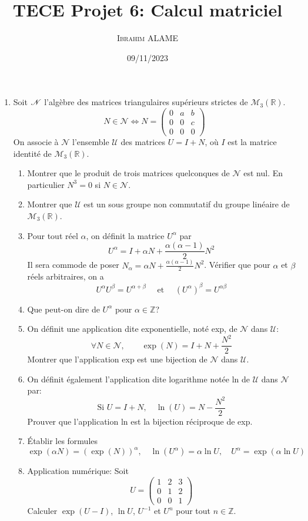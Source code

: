\documentclass{article}[11pt]
\title{TECE Projet 6: Calcul matriciel}
\author{ \textsc{Ibrahim ALAME}}
\date{09/11/2023}
\begin{document}
\maketitle
\begin{enumerate}
\item Soit ${\cal N}$ l'algèbre des matrices triangulaires supérieurs strictes de $\mathcal{M}_3(\mathbb{R})$.
\[N\in \mathcal{N} \Longleftrightarrow N=\left(\begin{array}{ccc} 0&a&b\\ 0&0&c\\0&0&0
\end{array}\right)\]
On associe à $\mathcal{N}$ l'ensemble  $\mathcal{U}$  des matrices $U=I+N$, où $I$ est la matrice identité de $\mathcal{M}_3(\mathbb{R})$.
\begin{enumerate}
\item  Montrer que le produit de trois matrices quelconques de $\mathcal{N}$ est nul. En particulier $N^3=0$ si $N\in\mathcal{N}$.
\item Montrer que $\mathcal{U}$ est un sous groupe non commutatif du groupe linéaire de $\mathcal{M}_3(\mathbb{R})$.
\item Pour tout réel $\alpha$, on définit la matrice $U^\alpha$ par
\[U^\alpha=I+\alpha N+\frac{\alpha(\alpha-1)}{2}N^2\]
Il sera commode de poser $N_\alpha = \alpha N +\frac{\alpha(\alpha-1)}{2}N^2$. Vérifier que pour $\alpha$ et $\beta$ réels arbitraires, on a
\[U^\alpha U^\beta =U^{\alpha+\beta}\quad\mbox{ et }\quad (U^\alpha)^\beta=U^{\alpha\beta}\]
\item Que peut-on dire de $U^\alpha$ pour $\alpha\in\mathbb{Z}$?
\item On définit une application dite exponentielle, noté exp, de $\mathcal{N}$ dans $\mathcal{U}$:
\[\forall N\in\mathcal{N},\qquad \exp(N)=I+N+\frac{N^2}{2}\]
Montrer que l'application exp est une bijection de $\mathcal{N}$ dans $\mathcal{U}$.
\item On définit également l'application dite logarithme notée ln de $\mathcal{U}$ dans $\mathcal{N}$ par:
\[\mbox{Si } U=I+N,\quad \ln(U)=N-\frac{N^2}{2}\]
Prouver que l'application ln est la bijection réciproque de exp.
\item Établir les formules
\[\exp(\alpha N)=(\exp(N))^\alpha,\quad \ln(U^\alpha)=\alpha\ln U,\quad U^\alpha=\exp(\alpha\ln U)\]
\item Application numérique: Soit
\[U=\left(\begin{array}{ccc} 1&2&3\\ 0&1&2\\0&0&1
\end{array}\right)\]
Calculer $\exp(U-I)$, $\ln U$, $U^{-1}$ et $U^n$ pour tout $n\in\mathbb{Z}$.
\end{enumerate}


\end{enumerate}
\end{document}
